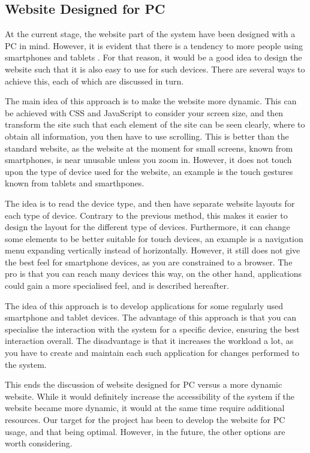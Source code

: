 \subsection{Website Designed for PC}
At the current stage, the website part of the system have been designed with a PC in mind.
However, it is evident that there is a tendency to more people using smartphones and tablets \citep{article:smartphonetabletincrease}.
For that reason, it would be a good idea to design the website such that it is also easy to use for such devices.
There are several ways to achieve this, each of which are discussed in turn.
\begin{description}[style=nextline]
	\item[Dynamic scaling]
	The main idea of this approach is to make the website more dynamic. This can be achieved with CSS and JavaScript to consider your screen size, and then transform the site such that each element of the site can be seen clearly, where to obtain all information, you then have to use scrolling.
	This is better than the standard website, as the website at the moment for small screens, known from smartphones, is near unusable unless you zoom in.
	However, it does not touch upon the type of device used for the website, an example is the touch gestures known from tablets and smarthpones.
	\item[Detection of device type]
	The idea is to read the device type, and then have separate website layouts for each type of device. 
	Contrary to the previous method, this makes it easier to design the layout for the different type of devices.
	Furthermore, it can change some elements to be better suitable for touch devices, an example is a navigation menu expanding vertically instead of horizontally.
	However, it still does not give the best feel for smartphone devices, as you are constrained to a browser.
	The pro is that you can reach many devices this way, on the other hand, applications could gain a more specialised feel, and is described hereafter.
	\item[Separate Application]
	The idea of this approach is to develop applications for some regularly used smartphone and tablet devices.
	The advantage of this approach is that you can specialise the interaction with the system for a specific device, ensuring the best interaction overall.
	The disadvantage is that it increases the workload a lot, as you have to create and maintain each such application for changes performed to the system.	
\end{description}
This ends the discussion of website designed for PC versus a more dynamic website.
While it would definitely increase the accessibility of the system if the website became more dynamic, it would at the same time require additional resources.
Our target for the project has been to develop the website for PC usage, and that being optimal.
However, in the future, the other options are worth considering.

